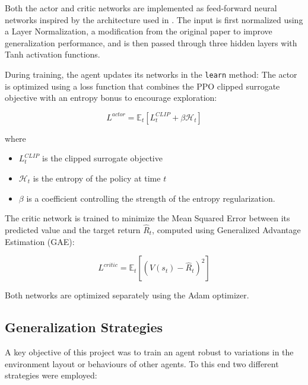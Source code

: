 \documentclass{article}
\begin{document}
Both the actor and critic networks are implemented as feed-forward neural networks inspired by the architecture used in \cite{ppo}. The input is first normalized using a Layer Normalization, a modification from the original paper to improve generalization performance, and is then passed through three hidden layers with Tanh activation functions. 

During training, the agent updates its networks in the \texttt{learn} method: The actor is optimized using a loss function that combines the PPO clipped surrogate objective with an entropy bonus to encourage exploration:

\begin{equation}
L^{actor} = \mathbb{E}_t[L^{CLIP}_t + \beta \mathcal{H}_t]
\end{equation}

where
\begin{itemize}
  \item $L^{CLIP}_t$ is the clipped surrogate objective
  \item $\mathcal{H}_t$ is the entropy of the policy at time $t$
  \item $\beta$ is a coefficient controlling the strength of the entropy regularization.
\end{itemize}

The critic network is trained to minimize the Mean Squared Error between its predicted value and the target return \( \hat{R}_t \), computed using Generalized Advantage Estimation (GAE):

\begin{equation}
L^{critic} = \mathbb{E}_t[(V(s_t) - \hat{R}_t)^2]
\end{equation}

Both networks are optimized separately using the Adam optimizer.

\subsection{Generalization Strategies}
A key objective of this project was to train an agent robust to variations in the environment layout or behaviours of other agents. To this end two different strategies were employed:
\end{document}
